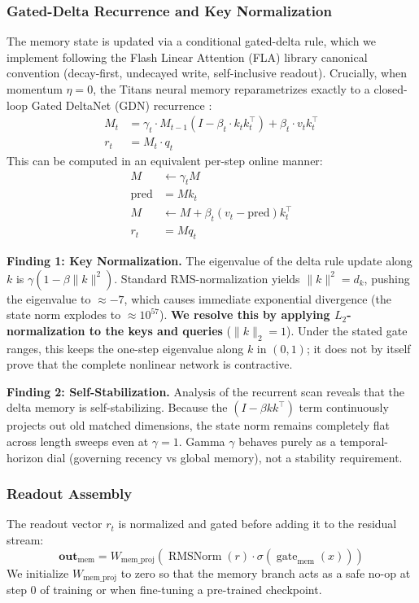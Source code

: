 \documentclass{article} %
\begin{document}
\subsubsection{Gated-Delta Recurrence and Key Normalization}
The memory state is updated via a conditional gated-delta rule, which we implement following the Flash Linear Attention (FLA) library \citep{fla2024} canonical convention (decay-first, undecayed write, self-inclusive readout). Crucially, when momentum $\eta = 0$, the Titans neural memory reparametrizes exactly to a closed-loop Gated DeltaNet (GDN) recurrence \citep{yang2024gated}:
\begin{align}
    M_t &= \gamma_t \cdot M_{t-1} (I - \beta_t \cdot k_t k_t^{\top}) + \beta_t \cdot v_t k_t^{\top} \\
    r_t &= M_t \cdot q_t
\end{align}
This can be computed in an equivalent per-step online manner:
\begin{align}
    M &\leftarrow \gamma_t M \\
    \mathrm{pred} &= M k_t \\
    M &\leftarrow M + \beta_t (v_t - \mathrm{pred}) k_t^{\top} \\
    r_t &= M q_t
\end{align}

\textbf{Finding 1: Key Normalization.} The eigenvalue of the delta rule update along $k$ is $\gamma (1 - \beta \|k\|^2)$. Standard RMS-normalization yields $\|k\|^2 = d_k$, pushing the eigenvalue to $\approx -7$, which causes immediate exponential divergence (the state norm explodes to $\approx 10^{57}$). \textbf{We resolve this by applying $L_2$-normalization to the keys and queries} ($\|k\|_2 = 1$). Under the stated gate ranges, this keeps the one-step eigenvalue along $k$ in $(0,1)$; it does not by itself prove that the complete nonlinear network is contractive.

\textbf{Finding 2: Self-Stabilization.} Analysis of the recurrent scan reveals that the delta memory is self-stabilizing. Because the $(I - \beta k k^{\top})$ term continuously projects out old matched dimensions, the state norm remains completely flat across length sweeps even at $\gamma=1$. Gamma $\gamma$ behaves purely as a temporal-horizon dial (governing recency vs global memory), not a stability requirement.

\subsubsection{Readout Assembly}
The readout vector $r_t$ is normalized and gated before adding it to the residual stream:
\begin{equation}
    \mathbf{out}_{\text{mem}} = W_{\text{mem\_proj}}\left( \operatorname{RMSNorm}(r) \cdot \sigma(\operatorname{gate}_{\text{mem}}(x)) \right)
\end{equation}
We initialize $W_{\text{mem\_proj}}$ to zero so that the memory branch acts as a safe no-op at step 0 of training or when fine-tuning a pre-trained checkpoint.
\end{document}
